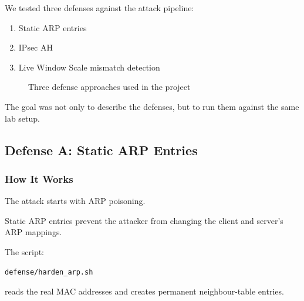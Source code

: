 \documentclass[11pt]{article}
\begin{document}
We tested three defenses against the attack pipeline:

\begin{enumerate}
    \item Static ARP entries
    \item IPsec AH
    \item Live Window Scale mismatch detection
\end{enumerate}

\begin{figure}[h]
\centering
{}
\caption{Three defense approaches used in the project}
\end{figure}

The goal was not only to describe the defenses, but to run them
against the same lab setup.

\subsection{Defense A: Static ARP Entries}

\subsubsection*{How It Works}

The attack starts with ARP poisoning.

Static ARP entries prevent the attacker from changing the client and
server's ARP mappings.

The script:

\begin{lstlisting}
defense/harden_arp.sh
\end{lstlisting}

reads the real MAC addresses and creates permanent neighbour-table
entries.
\end{document}
